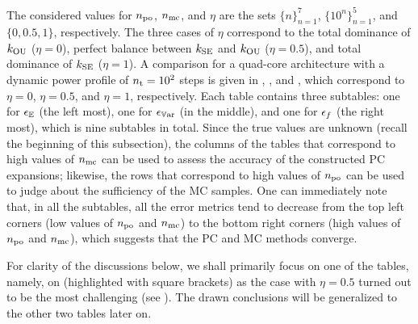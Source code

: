 The considered values for ${n_\text{po}}$, ${n_\text{mc}}$, and $\eta$ are the sets $\{ n \}_{n = 1}^7$, $\{ 10^n \}_{n = 1}^5$, and $\{ 0, 0.5, 1 \}$, respectively.
The three cases of $\eta$ correspond to the total dominance of $\fCorr_\OU$ ($\eta = 0$), perfect balance between $\fCorr_\SE$ and $\fCorr_\OU$ ($\eta = 0.5$), and total dominance of $\fCorr_\SE$ ($\eta = 1$).
A comparison for a quad-core architecture with a dynamic power profile of ${n_\text{t}} = 10^2$ steps is given in , , and , which correspond to $\eta = 0$, $\eta = 0.5$, and $\eta = 1$, respectively.
Each table contains three subtables: one for $\epsilon_\mathbb{E}$ (the left most), one for $\epsilon_{\mathbb{V}\text{ar}}$ (in the middle), and one for $\epsilon_f$ (the right most), which is nine subtables in total.
Since the true values are unknown (recall the beginning of this subsection), the columns of the tables that correspond to high values of ${n_\text{mc}}$ can be used to assess the accuracy of the constructed PC expansions; likewise, the rows that correspond to high values of ${n_\text{po}}$ can be used to judge about the sufficiency of the MC samples.
One can immediately note that, in all the subtables, all the error metrics tend to decrease from the top left corners (low values of ${n_\text{po}}$ and ${n_\text{mc}}$) to the bottom right corners (high values of ${n_\text{po}}$ and ${n_\text{mc}}$), which suggests that the PC and MC methods converge.

For clarity of the discussions below, we shall primarily focus on one of the tables, namely, on  (highlighted with square brackets) as the case with $\eta = 0.5$ turned out to be the most challenging (see ).
The drawn conclusions will be generalized to the other two tables later on.

